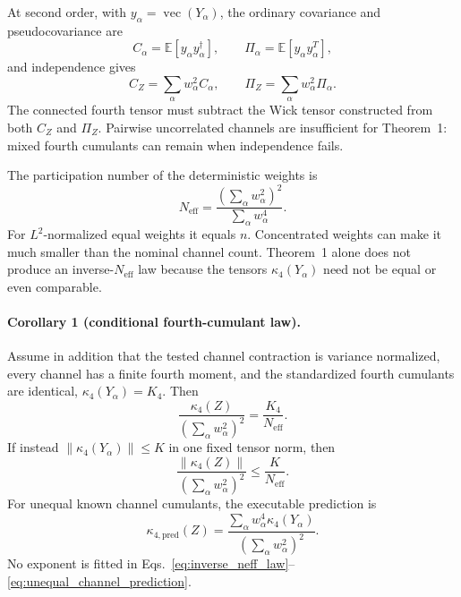 At second order, with $y_\alpha=\operatorname{vec}(Y_\alpha)$, the ordinary
covariance and pseudocovariance are
\begin{equation}
 C_\alpha=\mathbb E[y_\alpha y_\alpha^\dagger],
 \qquad
 \Pi_\alpha=\mathbb E[y_\alpha y_\alpha^T],
 \label{eq:channel_second_moments}
\end{equation}
and independence gives
\begin{equation}
 C_Z=\sum_\alpha w_\alpha^2C_\alpha,
 \qquad
 \Pi_Z=\sum_\alpha w_\alpha^2\Pi_\alpha.
 \label{eq:weighted_second_moments}
\end{equation}
The connected fourth tensor must subtract the Wick tensor constructed from
both $C_Z$ and $\Pi_Z$.  Pairwise uncorrelated channels are insufficient for
Theorem~1: mixed fourth cumulants can remain when independence fails.

The participation number of the deterministic weights is
\begin{equation}
 N_{\mathrm{eff}}
 =\frac{\left(\sum_\alpha w_\alpha^2\right)^2}
 {\sum_\alpha w_\alpha^4} .
 \label{eq:effective_channel_number}
\end{equation}
For $L^2$-normalized equal weights it equals $n$.  Concentrated weights can
make it much smaller than the nominal channel count.  Theorem~1 alone does
not produce an inverse-$N_{\mathrm{eff}}$ law because the tensors
$\kappa_4(Y_\alpha)$ need not be equal or even comparable.

\paragraph{Corollary 1 (conditional fourth-cumulant law).}
Assume in addition that the tested channel contraction is variance
normalized, every channel has a finite fourth moment, and the standardized
fourth cumulants are identical,
$\kappa_4(Y_\alpha)=K_4$.  Then
\begin{equation}
 \frac{\kappa_4(Z)}
 {\left(\sum_\alpha w_\alpha^2\right)^2}
 =\frac{K_4}{N_{\mathrm{eff}}} .
 \label{eq:inverse_neff_law}
\end{equation}
If instead $\|\kappa_4(Y_\alpha)\|\le K$ in one fixed tensor norm, then
\begin{equation}
 \frac{\|\kappa_4(Z)\|}
 {\left(\sum_\alpha w_\alpha^2\right)^2}
 \le\frac{K}{N_{\mathrm{eff}}} .
 \label{eq:inverse_neff_bound}
\end{equation}
For unequal known channel cumulants, the executable prediction is
\begin{equation}
 \kappa_{4,\mathrm{pred}}(Z)
 =\frac{\sum_\alpha w_\alpha^4\kappa_4(Y_\alpha)}
 {\left(\sum_\alpha w_\alpha^2\right)^2} .
 \label{eq:unequal_channel_prediction}
\end{equation}
No exponent is fitted in Eqs.~\eqref{eq:inverse_neff_law}--
\eqref{eq:unequal_channel_prediction}.

